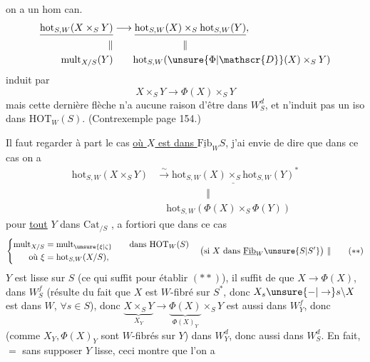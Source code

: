 on a un hom can.
\[
\begin{aligned}
\underline{\mathrm{hot}_{S,W}(X\times_S Y)}&\longrightarrow
\underline{\mathrm{hot}_{S,W}(X)\times_S\mathrm{hot}_{S,W}(Y)},\\
\Vert&\hspace{7em}\Vert\\
\mathrm{mult}_{X/S}(Y)&\qquad\mathrm{hot}_{S,W}(\unsure{\Phi|\mathscr{D}}(X)\times_S Y)
\end{aligned}
\]
induit par
\[
X\times_S Y\longrightarrow\Phi(X)\times_S Y
\]
mais cette dernière flèche n'a aucune raison d'être dans $W_S^d$,  et n'induit  pas  un iso dans $\mathrm{HOT}_W(S)$. (Contrexemple page 154.)

Il faut regarder à part le cas \uline{où $X$ est dans $\underline{\mathrm{Fib}}_W S$}, j'ai envie de dire que dans ce cas on a
\[
\begin{aligned}
\mathrm{hot}_{S,W}(X\times_S Y)&\overset{\sim}{\longrightarrow}
\underline{\mathrm{hot}_{S,W}(X)\times_S\mathrm{hot}_{S,W}(Y)}^{*}\\
&\hspace{5em}\Vert\\
&\quad\mathrm{hot}_{S,W}(\Phi(X)\times_S\Phi(Y))
\end{aligned}
\]
pour \uline{tout} $Y$ dans $\mathrm{Cat}_{/S}$ , a fortiori que dans ce cas
\[
\left\{\begin{aligned}
\mathrm{mult}_{X/S}&=\mathrm{mult}_{\unsure{\xi|\zeta}}\qquad\text{dans }\mathrm{HOT}_W(S)\\
\text{où }\xi&=\mathrm{hot}_{S,W}(X/S),
\end{aligned}\right.\quad\bigl(\text{si }X\text{ dans }\underline{\mathrm{Fib}}_W\unsure{S|S'}\bigr)\ \Vert\tag*{$(**)$}
\]
   $Y$ est lisse sur $S$ (ce qui suffit pour établir $(**)$), il suffit de   que $X\to\Phi(X)$,   dans $W_S^f$ (résulte du fait que $X$ est $W$-fibré sur $S^{*}$, donc $X_s\unsure{\mathbin{-}|\to}s\backslash X$ est dans $W$, $\forall s\in S$),
donc $\underbrace{X\times_S Y}_{X_Y}\to\underbrace{\Phi(X)}_{\Phi(X)_Y}\times_S Y$ est aussi dans $W_Y^f$,  donc (comme  $X_Y,\Phi(X)_Y$ sont $W$-fibrés sur $Y$) dans $W_Y^d$, donc aussi dans $W_S^d$. En fait, $=$ sans supposer $Y$ lisse, ceci montre que l'on a

